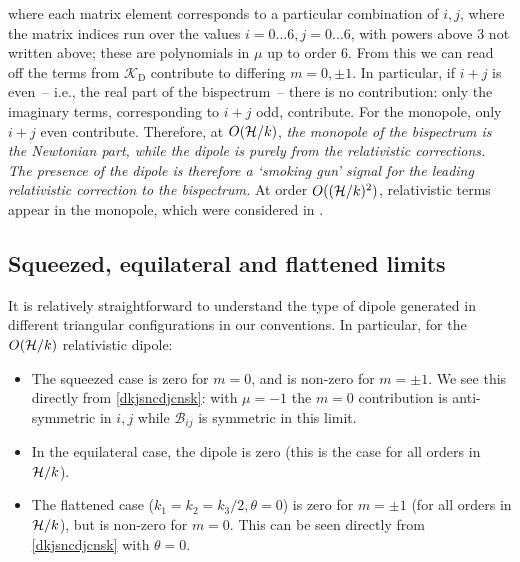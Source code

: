 where each matrix element corresponds to a particular combination of $i,j$,
where the matrix indices run over the values $i=0\ldots6, j=0\ldots6$, with powers above 3 not written above; these are polynomials in $\mu$ up to order 6. From this we can read off the terms from $\mathcal{K}_\text{D}$ contribute to differing $m=0,\pm1$. In particular, if $i+j$ is even~-- i.e., the real part of the bispectrum~--  there is no contribution: only the imaginary terms, corresponding to $i+j$ odd, contribute. For the monopole, only $i+j$ even contribute. Therefore, at $O(\mathcal{H}/k)$, \emph{the monopole of the bispectrum is the Newtonian part, while the dipole is purely from the relativistic corrections.  The presence of the dipole is therefore a `smoking gun' signal for the leading relativistic correction to the bispectrum.} At order $O((\mathcal{H}/k)^{2})$, relativistic terms appear in the monopole, which were considered in \citet{Umeh:2016nuh,Jolicoeur:2017nyt,Jolicoeur:2017eyi,Jolicoeur:2018blf}.\\


\subsection*{Squeezed, equilateral and flattened limits}

It is relatively straightforward to understand the type of dipole generated in different triangular configurations in our conventions. In particular, for the $O(\mathcal{H}/k)$ relativistic dipole:
\begin{itemize}
\item The squeezed case is zero for $m=0$, and is non-zero for $m=\pm1$. We see this directly from \eqref{dkjsncdjcnsk}: with $\mu=-1$ the $m=0$ contribution is anti-symmetric in $i,j$ while $\mathcal{B}_{ij}$ is symmetric in this limit.
\item In the equilateral case, the dipole is zero (this is the case for all orders in $\mathcal{H}/k$).
\item The flattened case ($k_1=k_2=k_3/2,\theta=0$) is zero for $m=\pm1$ (for all orders in $\mathcal{H}/k$), but is non-zero for $m=0$. This can be seen directly from \eqref{dkjsncdjcnsk} with $\theta=0$.
\end{itemize}
 
